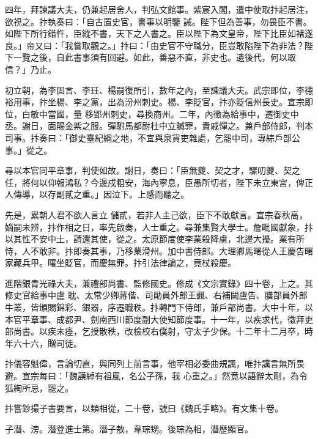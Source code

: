 \begin{pinyinscope}
 四年，拜諫議大夫，仍兼起居舍人，判弘文館事。紫宸入閣，遣中使取抃起居注，欲視之。抃執奏曰：「自古置史官，書事以明鑒
 誡。陛下但為善事，勿畏臣不書。如陛下所行錯忤，臣縱不書，天下之人書之。臣以陛下為文皇帝，陛下比臣如褚遂良。」帝又曰：「我嘗取觀之。」抃曰：「由史官不守職分，臣豈敢陷陛下為非法？陛下一覽之後，自此書事須有回避。如此，善惡不直，非史也。遺後代，何以取信？」乃止。



 初立朝，為李固言、李玨、楊嗣復所引，數年之內，至諫議大夫。武宗即位，李德裕用事，抃坐楊、李之黨，出為汾州刺史。楊、李貶官，抃亦貶信州長史。宣宗即位，白敏中當國，量
 移郢州刺史，尋換商州。二年，內徵為給事中，遷御史中丞。謝日，面賜金紫之服。彈駙馬都尉杜中立贓罪，貴戚憚之。兼戶部侍郎，判本司事。抃奏曰：「御史臺紀綱之地，不宜與泉貨吏雜處，乞罷中司，專綜戶部公事。」從之。



 尋以本官同平章事，判使如故。謝日，奏曰：「臣無夔、契之才，驟叨夔、契之任，將何以仰報鴻私？今邊戍粗安，海內寧息，臣愚所切者，陛下未立東宮，俾正人傳導，以存副貳之重。」因泣下。上感而聽之。



 先是，累朝人君不欲人言立
 儲貳，若非人主己欲，臣下不敢獻言。宣宗春秋高，嫡嗣未辨，抃作相之日，率先啟奏，人士重之。尋兼集賢大學士。詹毗國獻象，抃以其性不安中土，請還其使，從之。太原節度使李業殺降虜，北邊大擾。業有所恃，人不敢非。抃即奏其事，乃移業滑州。加中書侍郎。大理卿馬曙從人王慶告曙家藏兵甲。曙坐貶官，而慶無罪。抃引法律論之，竟杖殺慶。



 進階銀青光祿大夫，兼禮部尚書、監修國史。修成《文宗實錄》四十卷，上之。其修史官給事中盧
 耽、太常少卿蔣偕、司勛員外郎王諷、右補闕盧告、膳部員外郎牛叢，皆頒賜錦彩、銀器，序遷職秩。抃轉門下侍郎，兼戶部尚書。大中十年，以本官平章事、成都尹、劍南西川節度副大使知節度事。十一年，以疾求代，徵拜吏部尚書。以疾未痊，乞授散秩，改檢校右僕射，守太子少保。十二年十二月卒，時年六十六，贈司徒。



 抃儀容魁偉，言論切直，與同列上前言事，他宰相必委曲規諷，唯抃讜言無所畏避。宣宗每曰：「魏謨綽有祖風，名公子孫，我
 心重之。」然竟以語辭太剛，為令狐綯所忌，罷之。



 抃嘗鈔撮子書要言，以類相從，二十卷，號曰《魏氏手略》。有文集十卷。



 子潛、滂。潛登進士第。潛子敖，韋琮甥。後琮為相，潛歷顯官。




\end{pinyinscope}
